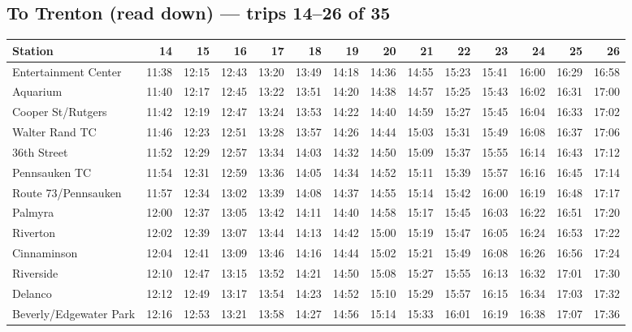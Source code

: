 \subsection*{To Trenton (read down) --- trips 14--26 of 35}
\begin{center}\footnotesize\setlength{\tabcolsep}{3pt}\begin{tabular}{@{}lrrrrrrrrrrrrr@{}}\toprule
Station & 14 & 15 & 16 & 17 & 18 & 19 & 20 & 21 & 22 & 23 & 24 & 25 & 26 \\\midrule
Entertainment Center & 11:38 & 12:15 & 12:43 & 13:20 & 13:49 & 14:18 & 14:36 & 14:55 & 15:23 & 15:41 & 16:00 & 16:29 & 16:58 \\
Aquarium & 11:40 & 12:17 & 12:45 & 13:22 & 13:51 & 14:20 & 14:38 & 14:57 & 15:25 & 15:43 & 16:02 & 16:31 & 17:00 \\
Cooper St/Rutgers & 11:42 & 12:19 & 12:47 & 13:24 & 13:53 & 14:22 & 14:40 & 14:59 & 15:27 & 15:45 & 16:04 & 16:33 & 17:02 \\
Walter Rand TC & 11:46 & 12:23 & 12:51 & 13:28 & 13:57 & 14:26 & 14:44 & 15:03 & 15:31 & 15:49 & 16:08 & 16:37 & 17:06 \\
36th Street & 11:52 & 12:29 & 12:57 & 13:34 & 14:03 & 14:32 & 14:50 & 15:09 & 15:37 & 15:55 & 16:14 & 16:43 & 17:12 \\
Pennsauken TC & 11:54 & 12:31 & 12:59 & 13:36 & 14:05 & 14:34 & 14:52 & 15:11 & 15:39 & 15:57 & 16:16 & 16:45 & 17:14 \\
Route 73/Pennsauken & 11:57 & 12:34 & 13:02 & 13:39 & 14:08 & 14:37 & 14:55 & 15:14 & 15:42 & 16:00 & 16:19 & 16:48 & 17:17 \\
Palmyra & 12:00 & 12:37 & 13:05 & 13:42 & 14:11 & 14:40 & 14:58 & 15:17 & 15:45 & 16:03 & 16:22 & 16:51 & 17:20 \\
Riverton & 12:02 & 12:39 & 13:07 & 13:44 & 14:13 & 14:42 & 15:00 & 15:19 & 15:47 & 16:05 & 16:24 & 16:53 & 17:22 \\
Cinnaminson & 12:04 & 12:41 & 13:09 & 13:46 & 14:16 & 14:44 & 15:02 & 15:21 & 15:49 & 16:08 & 16:26 & 16:56 & 17:24 \\
Riverside & 12:10 & 12:47 & 13:15 & 13:52 & 14:21 & 14:50 & 15:08 & 15:27 & 15:55 & 16:13 & 16:32 & 17:01 & 17:30 \\
Delanco & 12:12 & 12:49 & 13:17 & 13:54 & 14:23 & 14:52 & 15:10 & 15:29 & 15:57 & 16:15 & 16:34 & 17:03 & 17:32 \\
Beverly/Edgewater Park & 12:16 & 12:53 & 13:21 & 13:58 & 14:27 & 14:56 & 15:14 & 15:33 & 16:01 & 16:19 & 16:38 & 17:07 & 17:36 \\

\end{tabular}
\end{center}

